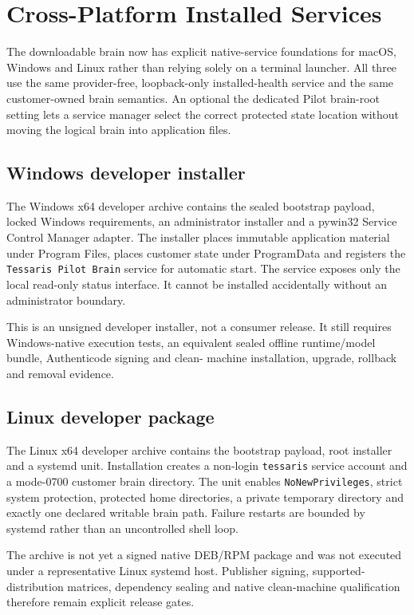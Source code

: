 \section{Cross-Platform Installed Services}

The downloadable brain now has explicit native-service foundations for macOS, Windows and Linux
rather than relying solely on a terminal launcher. All three use the same provider-free,
loopback-only installed-health service and the same customer-owned brain semantics. An optional
the dedicated Pilot brain-root setting lets a service manager select the correct protected
state location without moving the logical brain into application files.

\subsection{Windows developer installer}

The Windows x64 developer archive contains the sealed bootstrap payload, locked Windows
requirements, an administrator installer and a pywin32 Service Control Manager adapter. The
installer places immutable application material under Program Files, places customer state under
ProgramData and registers the \texttt{Tessaris Pilot Brain} service for automatic start. The service exposes
only the local read-only status interface. It cannot be installed accidentally without an
administrator boundary.

This is an unsigned developer installer, not a consumer release. It still requires Windows-native
execution tests, an equivalent sealed offline runtime/model bundle, Authenticode signing and clean-
machine installation, upgrade, rollback and removal evidence.

\subsection{Linux developer package}

The Linux x64 developer archive contains the bootstrap payload, root installer and a systemd unit.
Installation creates a non-login \texttt{tessaris} service account and a mode-0700 customer brain
directory. The unit enables \texttt{NoNewPrivileges}, strict system protection, protected home
directories, a private temporary directory and exactly one declared writable brain path. Failure
restarts are bounded by systemd rather than an uncontrolled shell loop.

The archive is not yet a signed native DEB/RPM package and was not executed under a representative
Linux systemd host. Publisher signing, supported-distribution matrices, dependency
sealing and native clean-machine qualification therefore remain explicit release gates.

